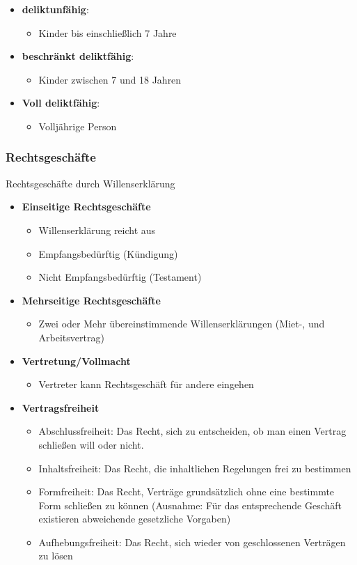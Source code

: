 \begin{itemize}
    \item \textbf{deliktunfähig}:
    	\begin{itemize}
    		\item Kinder bis einschließlich 7 Jahre
    	\end{itemize}
    \item\textbf{beschränkt deliktfähig}:
    	\begin{itemize}
    		\item Kinder zwischen 7 und 18 Jahren
    	\end{itemize}
    \item\textbf{Voll deliktfähig}:
    	\begin{itemize}
    		\item Volljährige Person
    	\end{itemize}
\end{itemize}    		

\subsubsection{Rechtsgeschäfte}

Rechtsgeschäfte durch Willenserklärung

\begin{itemize}
	\item \textbf{Einseitige Rechtsgeschäfte}
	\begin{itemize}
		\item Willenserklärung reicht aus
		\item Empfangsbedürftig (Kündigung)
		\item Nicht Empfangsbedürftig (Testament)
	\end{itemize}
	\item \textbf{Mehrseitige Rechtsgeschäfte}
	\begin{itemize}
		\item Zwei oder Mehr übereinstimmende Willenserklärungen (Miet-, und Arbeitsvertrag)
	\end{itemize}
	\item \textbf{Vertretung/Vollmacht}
	\begin{itemize}
		\item Vertreter kann Rechtsgeschäft für andere eingehen
	\end{itemize}
	\item \textbf{Vertragsfreiheit}
	\begin{itemize}
		\item Abschlussfreiheit: Das Recht, sich zu entscheiden, ob man einen Vertrag schließen will oder nicht.
		\item Inhaltsfreiheit: Das Recht, die inhaltlichen Regelungen frei zu bestimmen
		\item Formfreiheit: Das Recht, Verträge grundsätzlich ohne eine bestimmte Form schließen zu können (Ausnahme: Für das entsprechende Geschäft existieren abweichende gesetzliche Vorgaben)
		\item Aufhebungsfreiheit: Das Recht, sich wieder von geschlossenen Verträgen zu lösen
	\end{itemize}
\end{itemize}
	
